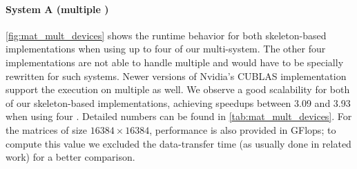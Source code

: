 \paragraph{System A (multiple \GPUs)}
\autoref{fig:mat_mult_devices} shows the runtime behavior for both \allpairs skeleton-based implementations when using up to four \GPUs of our multi-\GPU system.
The other four implementations are not able to handle multiple \GPUs and would have to be specially rewritten for such systems.
Newer versions of Nvidia's CUBLAS implementation support the execution on multiple \GPUs as well.
We observe a good scalability for both of our skeleton-based implementations, achieving speedups between 3.09 and 3.93 when using four \GPUs.
Detailed numbers can be found in \autoref{tab:mat_mult_devices}.
For the matrices of size $16384\times 16384$, performance is also provided in GFlops;
to compute this value we excluded the data-transfer time (as usually done in related work) for a better comparison.

\FloatBarrier
